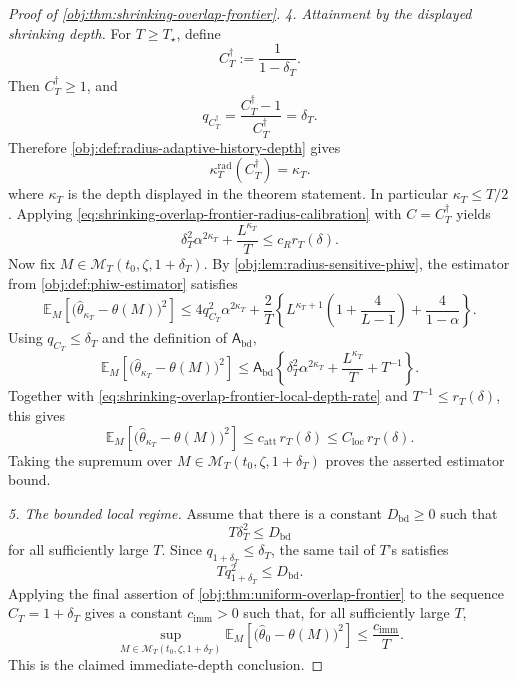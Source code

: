 \begin{proof}[Proof of \cref{obj:thm:shrinking-overlap-frontier}]
\emph{4. Attainment by the displayed shrinking depth.}
For \(T\ge T_\star\), define
\[
C_T^\dagger:=\frac{1}{1-\delta_T}.
\]
Then \(C_T^\dagger\ge1\), and
\[
q_{C_T^\dagger}
=
\frac{C_T^\dagger-1}{C_T^\dagger}
=
\delta_T .
\]
Therefore \cref{obj:def:radius-adaptive-history-depth} gives
\begin{equation}\label{eq:shrinking-overlap-frontier-depth-identity}
\kappa_T^{\mathrm{rad}}(C_T^\dagger)=\kappa_T.
\end{equation}
where \(\kappa_T\) is the depth displayed in the theorem statement.  In
particular \(\kappa_T\le T/2\).  Applying \cref{eq:shrinking-overlap-frontier-radius-calibration} with \(C=C_T^\dagger\) yields
\begin{equation}\label{eq:shrinking-overlap-frontier-local-depth-rate}
\delta_T^2\alpha^{2\kappa_T}
+\frac{L^{\kappa_T}}{T}
\le
c_R r_T(\delta).
\end{equation}
Now fix \(M\in\mathcal M_T(t_0,\zeta,1+\delta_T)\).  By
\cref{obj:lem:radius-sensitive-phiw}, the estimator from
\cref{obj:def:phiw-estimator} satisfies
\[
\mathbb E_M\!\left[
\bigl(\widehat\theta_{\kappa_T}-\theta(M)\bigr)^2
\right]
\le
4q_{C_T}^2\alpha^{2\kappa_T}
+\frac{2}{T}
\left\{
L^{\kappa_T+1}\left(1+\frac{4}{L-1}\right)
+\frac{4}{1-\alpha}
\right\}.
\]
Using \(q_{C_T}\le\delta_T\) and the definition of
\(\mathsf A_{\mathrm{bd}}\),
\[
\mathbb E_M\!\left[
\bigl(\widehat\theta_{\kappa_T}-\theta(M)\bigr)^2
\right]
\le
\mathsf A_{\mathrm{bd}}
\left\{
\delta_T^2\alpha^{2\kappa_T}
+\frac{L^{\kappa_T}}{T}
+T^{-1}
\right\}.
\]
Together with \cref{eq:shrinking-overlap-frontier-local-depth-rate} and \(T^{-1}\le r_T(\delta)\), this gives
\[
\mathbb E_M\!\left[
\bigl(\widehat\theta_{\kappa_T}-\theta(M)\bigr)^2
\right]
\le
c_{\mathrm{att}}\,r_T(\delta)
\le
C_{\mathrm{loc}}\,r_T(\delta).
\]
Taking the supremum over
\(M\in\mathcal M_T(t_0,\zeta,1+\delta_T)\) proves the asserted estimator
bound. %

\emph{5. The bounded local regime.}
Assume that there is a constant \(D_{\mathrm{bd}}\ge0\) such that
\[
T\delta_T^2\le D_{\mathrm{bd}}
\]
for all sufficiently large \(T\).  Since \(q_{1+\delta_T}\le\delta_T\), the
same tail of \(T\)'s satisfies
\[
Tq_{1+\delta_T}^2\le D_{\mathrm{bd}}.
\]
Applying the final assertion of \cref{obj:thm:uniform-overlap-frontier} to
the sequence \(C_T=1+\delta_T\) gives a constant \(c_{\mathrm{imm}}>0\) such
that, for all sufficiently large \(T\),
\[
\sup_{M\in\mathcal M_T(t_0,\zeta,1+\delta_T)}
\mathbb E_M\!\left[
\bigl(\widehat\theta_0-\theta(M)\bigr)^2
\right]
\le
\frac{c_{\mathrm{imm}}}{T}.
\]
This is the claimed immediate-depth conclusion. %
\end{proof}

